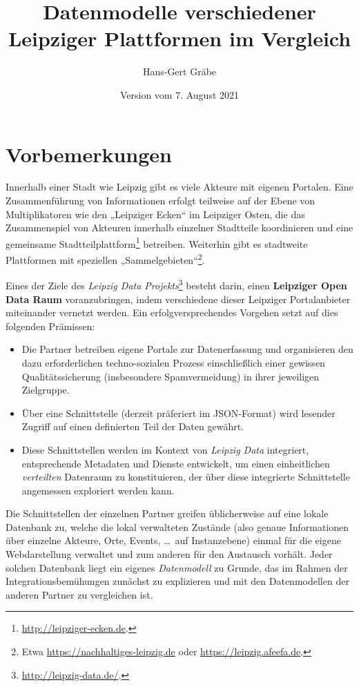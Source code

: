 \documentclass[a4paper,11pt]{article}
\title{Datenmodelle verschiedener\\ Leipziger Plattformen im Vergleich}
\author{Hans-Gert Gräbe}
\date{Version vom 7. August 2021}
\begin{document}
\maketitle
\tableofcontents 
\newpage

\section{Vorbemerkungen}

Innerhalb einer Stadt wie Leipzig gibt es viele Akteure mit eigenen Portalen.
Eine Zusammenführung von Informationen erfolgt teilweise auf der Ebene von
Multiplikatoren wie den „Leipziger Ecken“ im Leipziger Osten, die das
Zusammenspiel von Akteuren innerhalb einzelner Stadtteile koordinieren und
eine gemeinsame Stadtteilplattform\footnote{\url{http://leipziger-ecken.de}.}
betreiben.  Weiterhin gibt es stadtweite Plattformen mit speziellen
„Sammelgebieten“\footnote{Etwa \url{https://nachhaltiges-leipzig.de} oder
\url{https://leipzig.afeefa.de}.}.

Eines der Ziele des \emph{Leipzig Data
  Projekts}\footnote{\url{http://leipzig-data.de/}.} besteht darin, einen
\textbf{Leipziger Open Data Raum} voranzubringen, indem verschiedene dieser
Leipziger Portalanbieter miteinander vernetzt werden. Ein erfolgversprechendes
Vorgehen setzt auf dies folgenden Prämissen:
\begin{itemize}
\item [1)] Die Partner betreiben eigene Portale zur Datenerfassung und
  organisieren den dazu erforderlichen techno-sozialen Prozess einschließlich
  einer gewissen Qualitätssicherung (insbesondere Spamvermeidung) in ihrer
  jeweiligen Zielgruppe. 
\item [2)] Über eine Schnittstelle (derzeit präferiert im JSON-Format) wird
  lesender Zugriff auf einen definierten Teil der Daten gewährt.
\item [3)] Diese Schnittstellen werden im Kontext von \emph{Leipzig Data}
  integriert, entsprechende Metadaten und Dienste entwickelt, um einen
  einheitlichen \emph{verteilten} Datenraum zu konstituieren, der über diese
  integrierte Schnittstelle angemessen exploriert werden kann. 
\end{itemize}
Die Schnittstellen der einzelnen Partner greifen üblicherweise auf eine lokale
Datenbank zu, welche die lokal verwalteten Zustände (also genaue Informationen
über einzelne Akteure, Orte, Events, \ldots\ auf Instanzebene) einmal für die
eigene Webdarstellung verwaltet und zum anderen für den Austausch vorhält.
Jeder solchen Datenbank liegt ein eigenes \emph{Datenmodell} zu Grunde, das im
Rahmen der Integrationsbemühungen zunächst zu explizieren und mit den
Datenmodellen der anderen Partner zu vergleichen ist.
\end{document}
